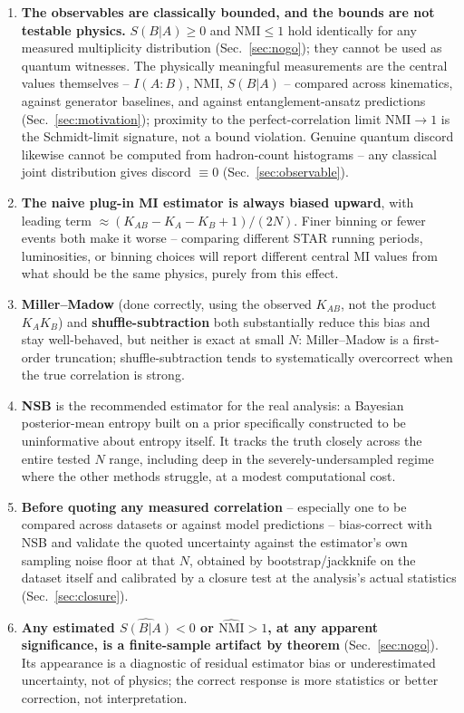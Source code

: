 \documentclass[11pt]{article}
\newcommand{\SBA}{S(B|A)}
\newcommand{\NMI}{\mathrm{NMI}}
\begin{document}
\begin{enumerate}

\item \textbf{The observables are classically bounded, and the bounds are
not testable physics.} $\SBA\geq0$ and $\NMI\leq1$ hold identically for
any measured multiplicity distribution (Sec.~\ref{sec:nogo}); they cannot
be used as quantum witnesses. The physically meaningful measurements are
the central values themselves -- $I(A{:}B)$, $\NMI$, $\SBA$ -- compared
across kinematics, against generator baselines, and against
entanglement-ansatz predictions (Sec.~\ref{sec:motivation}); proximity to
the perfect-correlation limit $\NMI\to1$ is the Schmidt-limit signature,
not a bound violation. Genuine quantum discord likewise cannot be
computed from hadron-count histograms -- any classical joint distribution
gives discord $\equiv0$ (Sec.~\ref{sec:observable}).

\item \textbf{The naive plug-in MI estimator is always biased upward},
with leading term $\approx(K_{AB}-K_A-K_B+1)/(2N)$. Finer binning or
fewer events both make it worse -- comparing different STAR running
periods, luminosities, or binning choices will report different central
MI values from what should be the same physics, purely from this effect.

\item \textbf{Miller--Madow} (done correctly, using the observed
$K_{AB}$, not the product $K_AK_B$) and \textbf{shuffle-subtraction} both
substantially reduce this bias and stay well-behaved, but neither is exact
at small $N$: Miller--Madow is a first-order truncation;
shuffle-subtraction tends to systematically overcorrect when the true
correlation is strong.

\item \textbf{NSB} is the recommended estimator for the real analysis: a
Bayesian posterior-mean entropy built on a prior specifically constructed
to be uninformative about entropy itself. It tracks the truth closely
across the entire tested $N$ range, including deep in the
severely-undersampled regime where the other methods struggle, at a
modest computational cost.

\item \textbf{Before quoting any measured correlation} -- especially one
to be compared across datasets or against model predictions --
bias-correct with NSB and validate the quoted uncertainty against the
estimator's own sampling noise floor at that $N$, obtained by
bootstrap/jackknife on the dataset itself and calibrated by a closure
test at the analysis's actual statistics (Sec.~\ref{sec:closure}).

\item \textbf{Any estimated $\widehat{\SBA}<0$ or $\widehat{\NMI}>1$, at
any apparent significance, is a finite-sample artifact by theorem}
(Sec.~\ref{sec:nogo}). Its appearance is a diagnostic of residual
estimator bias or underestimated uncertainty, not of physics; the correct
response is more statistics or better correction, not interpretation.

\end{enumerate}
\end{document}
